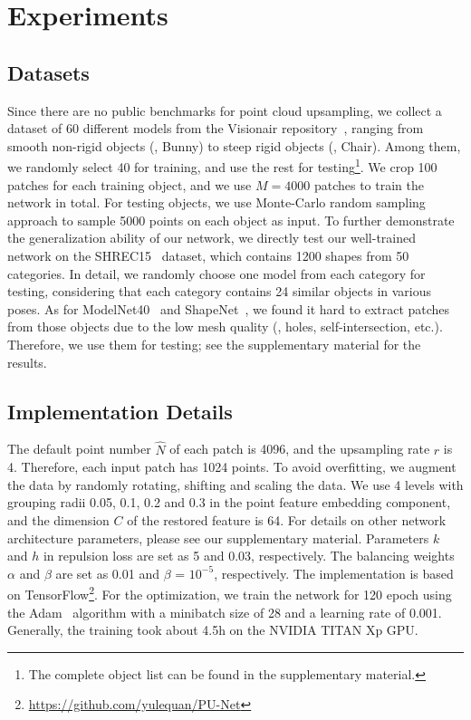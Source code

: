 \section{Experiments}
\label{sec:experiments}

\subsection{Datasets}
Since there are no public benchmarks for point cloud upsampling, we collect a dataset of 60 different models from the Visionair repository~\cite{timmurphy.org}, ranging from smooth non-rigid objects (\eg, Bunny) to steep rigid objects (\eg, Chair).
Among them, we randomly select 40 for training, and use the rest for testing\footnote{The complete object list can be found in the supplementary material.}.
We crop 100 patches for each training object, and we use $M$$=$$4000$ patches to train the network in total.
For testing objects, we use Monte-Carlo random sampling approach to sample 5000 points on each object as input.
To further demonstrate the generalization ability of our network, we directly test our well-trained network on the SHREC15~\cite{Lian2015} dataset, which contains 1200 shapes from 50 categories.
In detail, we randomly choose one model from each category for testing, considering that each category contains 24 similar objects in various poses. 
As for ModelNet40~\cite{wu20153d} and ShapeNet~\cite{chang2015shapenet}, we found it hard to extract patches from those objects due to the low mesh quality (\eg, holes, self-intersection, etc.).
Therefore, we use them for testing; see the supplementary material for the results.

\subsection{Implementation Details}
\label{sec:implementationdetails}
The default point number $\hat{N}$ of each patch is 4096, and the upsampling rate $r$ is 4. Therefore, each input patch has 1024 points.
To avoid overfitting, we augment the data by randomly rotating, shifting and scaling the data.
We use 4 levels with grouping radii 0.05, 0.1, 0.2 and 0.3 in the point feature embedding component, and the dimension $C$ of the restored feature is 64.  For details on other network architecture parameters, please see our supplementary material. 
Parameters $k$ and $h$ in repulsion loss are set as 5 and 0.03, respectively.
The balancing weights $\alpha$ and $\beta$ are set as 0.01 and $\beta$ = $10^{-5}$, respectively.
The implementation is based on TensorFlow\footnote{ \url{https://github.com/yulequan/PU-Net}}.
For the optimization, we train the network for 120 epoch using the Adam~\cite{kingma2014adam} algorithm with a minibatch size of 28 and a learning rate of 0.001.
Generally, the training took about 4.5h on the NVIDIA TITAN Xp GPU. 

